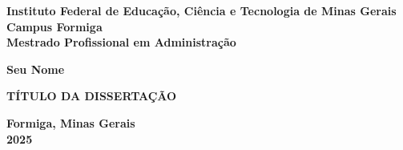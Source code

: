 

\newcommand{\fichaPlaceholder}{%
  \newpage
  \thispagestyle{empty}
  \vspace*{10cm}
  \begin{center}
  \fbox{%
    \begin{minipage}[t][8cm][t]{12cm}
      \footnotesize
      \textbf{Ficha Catalográfica} \\
      Elaborada pela Biblioteca do IFMG – Campus Formiga.

      \vspace{0.6em}
      Sobrenome, Nome.\\
      \hspace*{0.8em}Título: subtítulo / Nome do Autor. – Formiga, MG, 2025.\\
      \hspace*{0.8em}xx p.\\[0.3em]

      \hspace*{0.8em}Dissertação (Mestrado Profissional em Administração) – Instituto Federal de Minas Gerais – IFMG, Campus Formiga.\\[0.3em]

      1. Palavra-chave 1. 2. Palavra-chave 2. 3. Palavra-chave 3.\\
      I. Orientador: Nome do Orientador. II. Instituto Federal de Minas Gerais.\\
    \end{minipage}%
  }
  \end{center}
}





\thispagestyle{empty}

\begin{center}
  \small
  \sc \textbf{Instituto Federal de Educação, Ciência e Tecnologia de Minas Gerais} \\ 
  \sc \textbf{Campus Formiga} \\
  \sc \textbf{Mestrado Profissional em Administração}
  
  \vspace{4cm}
  \sc \Large \textbf{Seu Nome} 

  \vspace{5cm}
  \large \textbf{TÍTULO DA DISSERTAÇÃO}

  \vfill
  \textbf{Formiga, Minas Gerais} \\
  \textbf{2025}
\end{center}

